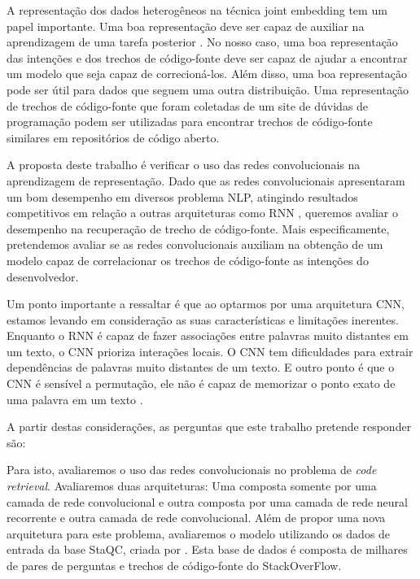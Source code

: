 A representação dos dados heterogêneos na técnica joint embedding tem um papel importante. Uma boa representação deve ser capaz de auxiliar na aprendizagem de uma tarefa
posterior \citep{Goodfellow-et-al-2016:representation-learning}. No nosso caso, uma boa representação das intenções e dos trechos de código-fonte deve ser capaz de ajudar a encontrar um modelo que seja capaz de correcioná-los. Além disso, uma boa representação pode ser útil para dados que seguem uma outra distribuição. Uma representação de trechos de código-fonte que foram coletadas de um site de dúvidas de programação podem ser utilizadas para encontrar trechos de código-fonte similares em repositórios de código aberto.

A proposta deste trabalho é verificar o uso das redes convolucionais na aprendizagem de representação. Dado que as redes convolucionais apresentaram um bom desempenho em diversos problema NLP, atingindo resultados competitivos em relação a outras arquiteturas como RNN \citep{tom-young:trends-deep-learning-nlp}, queremos avaliar o desempenho na recuperação de trecho de código-fonte. Mais especificamente, pretendemos avaliar se as redes convolucionais auxiliam na obtenção de um modelo capaz de correlacionar os trechos de código-fonte as intenções do desenvolvedor. 

Um ponto importante a ressaltar é que ao optarmos por uma arquitetura CNN, estamos levando em consideração as suas características e limitações inerentes. Enquanto o RNN é capaz de fazer associações entre palavras muito distantes em um texto, o CNN prioriza interações locais. O CNN tem dificuldades para extrair dependências de palavras muito distantes de um texto. E outro ponto é que o CNN é sensível a permutação, ele não é capaz de memorizar o ponto exato de uma palavra em um texto \cite{Goodfellow-et-al-2016:convolutional-networks, tom-young:trends-deep-learning-nlp}.

A partir destas considerações, as perguntas que este trabalho pretende responder são:



Para isto, avaliaremos o uso das redes convolucionais no problema de \textit{code retrieval}. Avaliaremos duas arquiteturas: Uma composta somente por uma camada de rede convolucional e outra composta por uma camada de rede neural recorrente e outra camada de rede convolucional. Além de propor uma nova arquitetura para este problema, avaliaremos o modelo utilizando os dados de entrada da base StaQC, criada por \cite{yao-2018}. Esta base de dados é composta de milhares de pares de perguntas e trechos de código-fonte do StackOverFlow.



